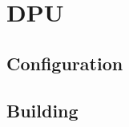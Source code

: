 \section{DPU}
\label{sec:embedded_platform:dpu}

\subsection{Configuration}
\label{subsec:embedded_platform:dpu:configuration}

\subsection{Building}
\label{subsec:embedded_platform:dpu:building}

